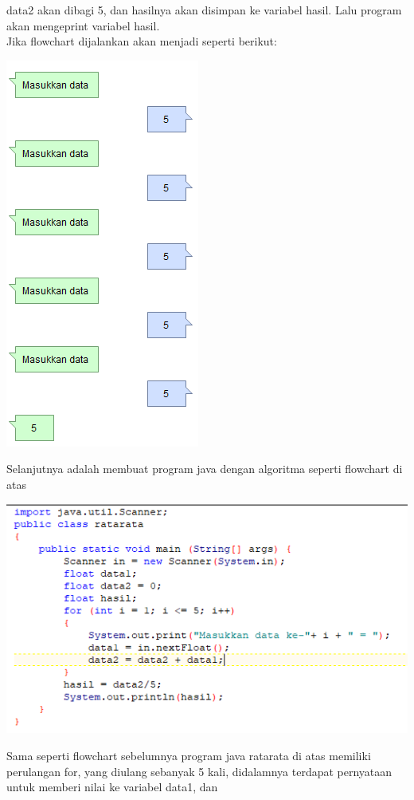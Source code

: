 \documentclass[a4paper,12pt]{article}
\begin{document}
data2 akan dibagi 5, dan hasilnya akan disimpan ke variabel hasil. Lalu program akan mengeprint variabel hasil.\\
Jika flowchart dijalankan akan menjadi seperti berikut:
\begin{center}
    \includegraphics[scale = 0.8]{praktik3.PNG}
\end{center}
Selanjutnya adalah membuat program java dengan algoritma seperti flowchart di atas
\begin{center}
    \includegraphics[scale = 0.8]{prak3.PNG}
\end{center}
Sama seperti flowchart sebelumnya program java ratarata di atas memiliki perulangan for, yang diulang sebanyak 5 kali, didalamnya terdapat pernyataan untuk memberi nilai ke variabel data1, dan
\end{document}
